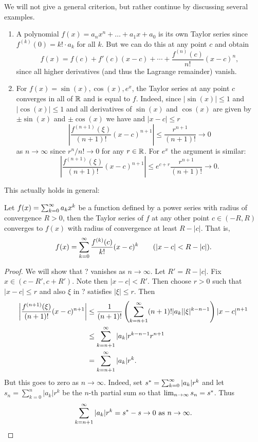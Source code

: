 \documentclass[10pt, a4paper]{article}
\newcommand{\limas}[3][n]{#2 \rightarrow #3 \text{ as } #1 \rightarrow \infty}
\begin{document}
We will not give a general criterion,
but rather continue by discussing several examples.
\begin{example}
    \begin{enumerate}[label = (\roman*)]
        \item A polynomial $f(x) = a_nx ^ n + \dotsc + a_1x + a_0$ is its own Taylor series since $f ^ {(k)}(0) = k! \cdot a_k$ for all $k$. But we can do this at any point $c$ and obtain
        \[
        f(x) = f(c) + f'(c)(x - c) + \dotsi + \frac{f ^ {(n)}(c)}{n!}(x - c) ^ n,
        \]
        since all higher derivatives
        (and thus the Lagrange remainder)
        vanish.

        \item For $f(x) = \sin(x), \cos(x), e ^ x$,
        the Taylor series at any point $c$ converges in all of $\R$ and is equal to $f$.
        Indeed,
        since $|\sin(x)| \leq 1$ and $|\cos(x)| \leq 1$ and all derivatives of $\sin(x)$ and $\cos(x)$ are given by $\pm\sin(x)$ and $\pm\cos(x)$ we have and $|x - c| \leq r$
        \[
        \left|\frac{f ^ {(n + 1)}(\xi)}{(n + 1)!}(x - c) ^ {n + 1}\right| \leq \frac{r ^ {n + 1}}{(n + 1)!} \rightarrow 0
        \]
        as $n \rightarrow \infty$ since $r ^ n / n! \rightarrow 0$ for any $r \in \R$.
        For $e ^ x$ the argument is similar:
        \[
        \left|\frac{f ^ {(n + 1)}(\xi)}{(n + 1)!}(x - c) ^ {n + 1}\right| \leq e ^ {c + r}\frac{r ^ {n + 1}}{(n + 1)!} \rightarrow 0.
        \]
    \end{enumerate}
\end{example}
This actually holds in general:
\begin{proposition}
    Let $f(x) = \infsumo a_kx ^ k$ be a function defined by a power series with radius of convergence $R > 0$,
    then the Taylor series of $f$ at any other point $c \in (-R, R)$ converges to $f(x)$ with radius of convergence at least $R - |c|$.
    That is,
    \[
    f(x) = \infsumo \frac{f ^ {(k)}(c)}{k!}(x - c) ^ k\qquad(|x - c| < R - |c|).
    \]
    \begin{proof}
        We will show that ? vanishes as $n \rightarrow \infty$.
        Let $R' = R - |c|$.
        Fix $x \in (c - R', c + R')$.
        Note then $|x - c| < R'$.
        Then choose $r > 0$ such that $|x - c| \leq r$ and also $\xi$ in ? satisfies $|\xi| \leq r$.
        Then
        \begin{align*}
            \left|\frac{f ^ {(n + 1)}(\xi)}{(n + 1)!}(x - c) ^ {n + 1}\right| &\leq \frac{1}{(n + 1)!}\left(\infsum[k = n + 1](n + 1)!|a_k||\xi| ^ {k - n - 1}\right)|x - c| ^ {n + 1} \\
            &\leq \infsum[k = n + 1]|a_k|r ^ {k - n - 1}r ^ {n + 1} \\
            &= \infsum[k = n + 1]|a_k|r ^ k.
        \end{align*}
        But this goes to zero as $n \rightarrow \infty$.
        Indeed,
        set $s ^ {*} = \infsumo|a_k|r ^ k$ and let $s_n = \sum_{k = 0}^{n}|a_k|r ^ k$ be the $n$-th partial sum so that $\liminfty s_n = s ^ {*}$.
        Thus
        \[
        \limas{\infsum[k = n + 1]|a_k|r ^ k = s ^ {*} - s}{0}.
        \]
    \end{proof}
\end{proposition}
\end{document}
